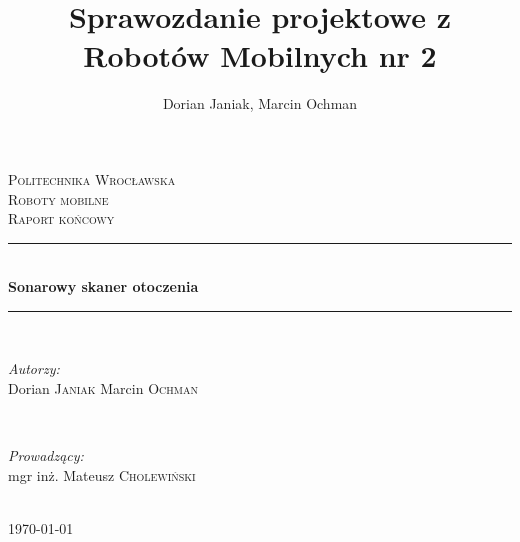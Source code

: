 \documentclass[a4paper]{article}
\author{Dorian Janiak, Marcin Ochman}
\title{Sprawozdanie projektowe z Robotów Mobilnych nr 2}
\begin{document}
\begin{titlepage}

\newcommand{\HRule}{\rule{\linewidth}{0.5mm}} 

\center 
 

\textsc{\LARGE Politechnika Wrocławska}\\[1.0cm] %
\textsc{\Large Roboty mobilne}\\[0.2cm] %
\textsc{\large Raport końcowy}\\[2cm]


\HRule \\[0.4cm]
{ \huge \bfseries Sonarowy skaner otoczenia}\\[0.4cm] %
\HRule \\[3cm]
 

\begin{minipage}{0.4\textwidth}
\begin{flushleft} \large
\emph{Autorzy:}\\
Dorian \textsc{Janiak}\newline
Marcin \textsc{Ochman}

\end{flushleft}
\end{minipage}
~
\begin{minipage}{0.4\textwidth}
\begin{flushright} \large
\emph{Prowadzący:} \\
mgr inż. Mateusz \textsc{Cholewiński}
\end{flushright}
\end{minipage}\\[12cm]

{\large \today}\\[3cm] 


\vfill 

\end{titlepage}
\end{document}
